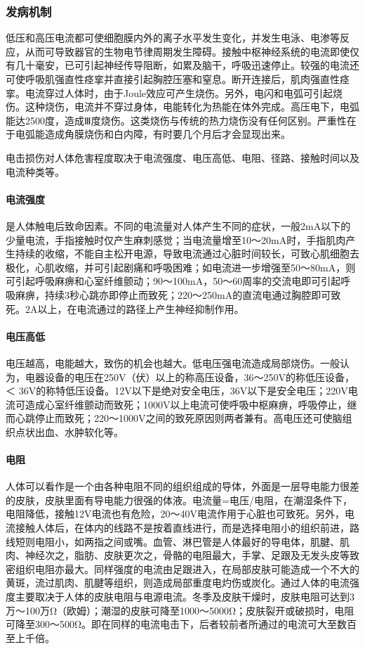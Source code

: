 \subsubsection{发病机制}

低压和高压电流都可使细胞膜内外的离子水平发生变化，并发生电泳、电渗等反应，从而可导致器官的生物电节律周期发生障碍。接触中枢神经系统的电流即使仅有几十毫安，已可引起神经传导阻断，如累及脑干，呼吸迅速停止。较强的电流还可使呼吸肌强直性痉挛并直接引起胸腔压塞和窒息。断开连接后，肌肉强直性痉挛。电流穿过人体时，由于Joule效应可产生烧伤。另外，电闪和电弧可引起烧伤。这种烧伤，电流并不穿过身体，电能转化为热能在体外完成。高压电下，电弧能达2500度，造成Ⅲ度烧伤。这类烧伤与传统的热力烧伤没有任何区别。严重性在于电弧能造成角膜烧伤和白内障，有时要几个月后才会显现出来。

电击损伤对人体危害程度取决于电流强度、电压高低、电阻、径路、接触时间以及电流种类等。

\paragraph{电流强度}

是人体触电后致命因素。不同的电流量对人体产生不同的症状，一般2mA以下的少量电流，手指接触时仅产生麻刺感觉；当电流量增至10～20mA时，手指肌肉产生持续的收缩，不能自主松开电源，导致电流通过心脏时间较长，可致心肌细胞去极化，心肌收缩，并可引起剧痛和呼吸困难；如电流进一步增强至50～80mA，则可引起呼吸麻痹和心室纤维颤动；90～100mA，50～60周率的交流电即可引起呼吸麻痹，持续3秒心跳亦即停止而致死；220～250mA的直流电通过胸腔即可致死。2A以上，在电流通过的路径上产生神经抑制作用。

\paragraph{电压高低}

电压越高，电能越大，致伤的机会也越大。低电压强电流造成局部烧伤。一般认为，电器设备的电压在250V（伏）以上的称高压设备，36～250V的称低压设备，＜
36V的称特低压设备。12V以下是绝对安全电压，36V以下是安全电压；220V电流可造成心室纤维颤动而致死；1000V以上电流可使呼吸中枢麻痹，呼吸停止，继而心跳停止而致死；220～1000V之间的致死原因则两者兼有。高电压还可使脑组织点状出血、水肿软化等。

\paragraph{电阻}

人体可以看作是一个由各种电阻不同的组织组成的导体，外面是一层导电能力很差的皮肤，皮肤里面有导电能力很强的体液。电流量=电压/电阻，在潮湿条件下，电阻降低，接触12V电流也有危险，20～40V电流作用于心脏也可致死。另外，电流接触人体后，在体内的线路不是按着直线进行，而是选择电阻小的组织前进，路线短则电阻小，如两指之间或嘴。血管、淋巴管是人体最好的导电体，肌腱、肌肉、神经次之，脂肪、皮肤更次之，骨骼的电阻最大，手掌、足跟及无发头皮等致密组织电阻亦最大。同样强度的电流由足跟进入，在局部皮肤可能造成一个不大的黄斑，流过肌肉、肌腱等组织，则造成局部重度电灼伤或炭化。通过人体的电流强度主要取决于人体的皮肤电阻与电源电流。冬季及皮肤干燥时，皮肤电阻可达到3万～100万Ω（欧姆）；潮湿的皮肤可降至1000～5000Ω；皮肤裂开或破损时，电阻可降至300～500Ω。即在同样的电流电击下，后者较前者所通过的电流可大至数百至上千倍。

